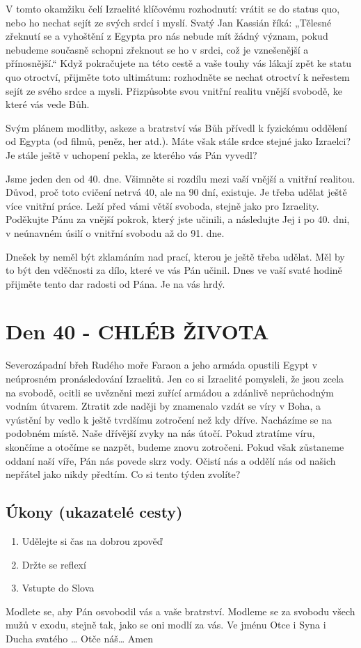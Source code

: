 \documentclass[11pt]{article}
\newcommand{\zacatekSestyTyden}{
  Severozápadní břeh Rudého moře \newline 
  Faraon a jeho armáda opustili Egypt v neúprosném pronásledování Izraelitů. Jen co si Izraelité pomysleli, že jsou zcela na svobodě, ocitli se uvězněni mezi zuřící armádou a zdánlivě neprůchodným vodním útvarem. Ztratit zde naději by znamenalo vzdát se víry v Boha, a vyústění by vedlo k ještě tvrdšímu zotročení než kdy dříve. Nacházíme se na podobném místě. Naše dřívější zvyky na nás útočí. Pokud ztratíme víru, skončíme a otočíme se nazpět, budeme znovu zotročeni. Pokud však zůstaneme oddaní naší víře, Pán nás povede skrz vody. Očistí nás a oddělí nás od našich nepřátel jako nikdy předtím. Co si tento týden zvolíte?

\subsection*{Úkony (ukazatelé cesty)}
\begin{enumerate}
  \item Udělejte si čas na dobrou zpověď
  \item Držte se reflexí
  \item Vstupte do Slova
\end{enumerate}
Modlete se, aby Pán osvobodil vás a vaše bratrství. \newline
Modleme se za svobodu všech mužů v exodu, stejně tak, jako se oni modlí za vás.\newline
Ve jménu Otce i Syna i Ducha svatého …  Otče náš… Amen
}
\begin{document}
V tomto okamžiku čelí Izraelité klíčovému rozhodnutí: vrátit se do status quo, nebo ho nechat sejít ze svých srdcí i
myslí. Svatý Jan Kassián říká: „Tělesné zřeknutí se a vyhoštění z Egypta pro nás nebude mít žádný význam, pokud
nebudeme současně schopni zřeknout se ho v srdci, což je vznešenější a přínosnější.“ Když pokračujete na této cestě a
vaše touhy vás lákají zpět ke statu quo otroctví, přijměte toto ultimátum: rozhodněte se nechat otroctví k neřestem sejít
ze svého srdce a mysli. Přizpůsobte svou vnitřní realitu vnější svobodě, ke které vás vede Bůh.

Svým plánem modlitby, askeze a bratrství vás Bůh přívedl k fyzickému oddělení od Egypta (od filmů, peněz, her atd.).
Máte však stále srdce stejné jako Izraelci? Je stále ještě v uchopení pekla, ze kterého vás Pán vyvedl?

Jsme jeden den od 40. dne. Všimněte si rozdílu mezi vaší vnější a vnitřní realitou. Důvod, proč toto cvičení netrvá 40,
ale na 90 dní, existuje. Je třeba udělat ještě více vnitřní práce. Leží před vámi větší svoboda, stejně jako pro Izraelity.
Poděkujte Pánu za vnější pokrok, který jste učinili, a následujte Jej i po 40. dni, v neúnavném úsilí o vnitřní svobodu až
do 91. dne.

Dnešek by neměl být zklamáním nad prací, kterou je ještě třeba udělat. Měl by to být den vděčnosti za dílo, které ve
vás Pán učinil. Dnes ve vaší svaté hodině přijměte tento dar radosti od Pána. Je na vás hrdý.



\newpage
\section{Den 40 - CHLÉB ŽIVOTA}
\zacatekSestyTyden
\end{document}
